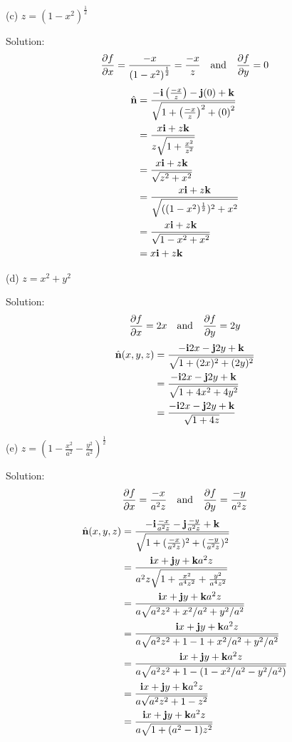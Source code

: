 \documentclass{article}
\begin{document}
\begin{enumerate}
    (c) $z = (1-x^2)^\frac{1}{2}$

    Solution:
    \[ \frac{\partial{f}}{\partial{x}} = \frac{-x}{{(1 - x^2)}^\frac{1}{2}} = \frac{-x}{z} \quad \textnormal{and} \quad \frac{\partial{f}}{\partial{y}} = 0 \]
    \begin{align*}
        \hat{\textbf{n}} &= \frac{-\textbf{i} \left( \frac{-x}{z} \right) -\textbf{j}(0) + \textbf{k}} {\sqrt{1 + {\left( \frac{-x}{z} \right)}^2 + {(0)}^2 }} \\
        &= \frac{x\textbf{i} + z\textbf{k}} {z\sqrt{1 + { \frac{x^2}{z^2} } }} \\
        &= \frac{x\textbf{i} + z\textbf{k}} {\sqrt{z^2 + x^2 }} \\
        &= \frac{x\textbf{i} + z\textbf{k}} {\sqrt{((1-x^2)^\frac{1}{2})^2 + x^2 }} \\
        &= \frac{x\textbf{i} + z\textbf{k}} {\sqrt{1-x^2 + x^2 }} \\
        &= x\textbf{i} + z\textbf{k}
    \end{align*}

    (d) $z = x^2 + y^2$

    Solution:
    \[ \frac{\partial{f}}{\partial{x}} = 2x \quad \textnormal{and} \quad \frac{\partial{f}}{\partial{y}} = 2y \]
    \begin{align*}
        \hat{\textbf{n}}(x,y,z) &= \frac{-\textbf{i}2x -\textbf{j}2y + \textbf{k}} {\sqrt{1 + (2x)^2 + (2y)^2 }} \\
        &= \frac{-\textbf{i}2x -\textbf{j}2y + \textbf{k}} {\sqrt{1 + 4x^2 + 4y^2}} \\
        &= \frac{-\textbf{i}2x -\textbf{j}2y + \textbf{k}} {\sqrt{1 + 4z}} \\
    \end{align*}

    (e) $z = {\left( 1 - \frac{x^2}{a^2} - \frac{y^2}{a^2} \right)}^\frac{1}{2}$

    Solution:
    \[ \frac{\partial{f}}{\partial{x}} = \frac{-x}{a^2z} \quad \textnormal{and} \quad \frac{\partial{f}}{\partial{y}} = \frac{-y}{a^2z} \]
    \begin{align*}
        \hat{\textbf{n}}(x,y,z) &= \frac{-\textbf{i}\frac{-x}{a^2z} -\textbf{j}\frac{-y}{a^2z} + \textbf{k}} {\sqrt{1 + (\frac{-x}{a^2z})^2 + (\frac{-y}{a^2z})^2 }} \\
        &= \frac{\textbf{i}x + \textbf{j}y + \textbf{k}a^2z} {a^2z\sqrt{1 + \frac{x^2}{a^4z^2} + \frac{y^2}{a^4z^2} }} \\
        &= \frac{\textbf{i}x + \textbf{j}y + \textbf{k}a^2z} {a\sqrt{a^2z^2 + x^2/a^2 + y^2/a^2 }} \\
        &= \frac{\textbf{i}x + \textbf{j}y + \textbf{k}a^2z} {a\sqrt{a^2z^2 + 1 - 1 + x^2/a^2 + y^2/a^2 }} \\
        &= \frac{\textbf{i}x + \textbf{j}y + \textbf{k}a^2z} {a\sqrt{a^2z^2 + 1 - (1 - x^2/a^2 - y^2/a^2) }} \\
        &= \frac{\textbf{i}x + \textbf{j}y + \textbf{k}a^2z} {a\sqrt{a^2z^2 + 1 - z^2 }} \\
        &= \frac{\textbf{i}x + \textbf{j}y + \textbf{k}a^2z} {a\sqrt{1 + (a^2 - 1)z^2 }} \\
    \end{align*}


\end{enumerate}
\end{document}

